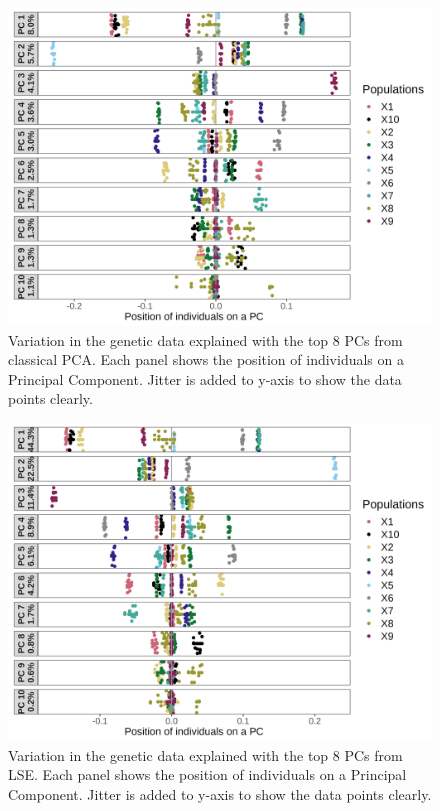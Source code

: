 \documentclass[12pt]{article}
\begin{document}
\begin{figure}[ht!]
    \includegraphics[width=16.5cm]{Images/ppca/Supplement/pcaplot2.png}
    \centering
    \caption{Variation in the genetic data explained with the top 8 PCs from classical PCA. Each panel shows the position of individuals on a Principal Component. Jitter is added to y-axis to show the data points clearly.}
    \label{figS1:pca_scale}
\end{figure}

\begin{figure}[ht!]
    \includegraphics[width=16.5cm]{Images/ppca/Supplement/lseplot2.png}
    \centering
    \caption{Variation in the genetic data explained with the top 8 PCs from LSE. Each panel shows the position of individuals on a Principal Component. Jitter is added to y-axis to show the data points clearly.}
    \label{figS1:lse_scale}
\end{figure}
\end{document}
